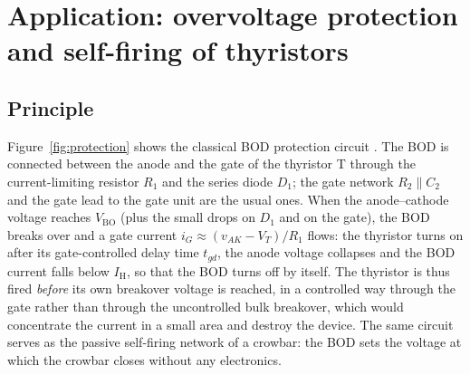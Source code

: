 \documentclass[11pt,a4paper]{article}
\newcommand{\Vbo}{V_{\mathrm{BO}}}
\newcommand{\Ih}{I_{\mathrm{H}}}
\begin{document}
\section{Application: overvoltage protection and self-firing of thyristors}
\label{sec:application}

\subsection{Principle}
Figure~\ref{fig:protection} shows the classical BOD protection circuit \cite{lawatsch1988,ixysapp}. The BOD is connected between the anode and the gate of the thyristor T through the current-limiting resistor $R_1$ and the series diode $D_1$; the gate network $R_2 \parallel C_2$ and the gate lead to the gate unit are the usual ones. When the anode--cathode voltage reaches $\Vbo$ (plus the small drops on $D_1$ and on the gate), the BOD breaks over and a gate current $i_G \approx (v_{AK}-V_T)/R_1$ flows: the thyristor turns on after its gate-controlled delay time $t_{gd}$, the anode voltage collapses and the BOD current falls below $\Ih$, so that the BOD turns off by itself. The thyristor is thus fired \emph{before} its own breakover voltage is reached, in a controlled way through the gate rather than through the uncontrolled bulk breakover, which would concentrate the current in a small area and destroy the device. The same circuit serves as the passive self-firing network of a crowbar: the BOD sets the voltage at which the crowbar closes without any electronics.
\end{document}
